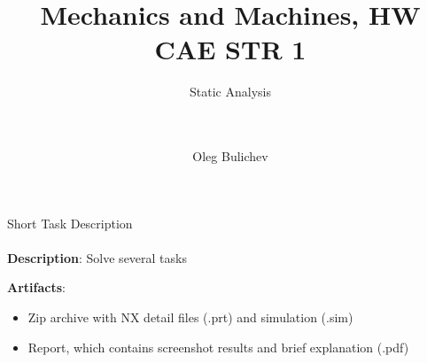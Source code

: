 \documentclass[aspectratio=169]{beamer}
\title[MaM]{Mechanics and Machines, HW CAE STR 1} %
\subtitle{Static Analysis
\\ \  \\ \ 
         } %
\author{Oleg Bulichev}
\newcommand{\fbckg}[1]{\usebackgroundtemplate{\texttt{[image: \#1]}}}%
\begin{document}
\setlength{\abovedisplayskip}{0pt}
\setlength{\belowdisplayskip}{0pt}
\setlength{\abovedisplayshortskip}{0pt}
\setlength{\belowdisplayshortskip}{0pt}

\fbckg{fibeamer/figs/title_page.png}

\fbckg{fibeamer/figs/common.png}

\note{\scriptsize \begin{itemize}
        \item \
    \end{itemize}}


\begin{frame}[t]{Short Task Description}
    \framesubtitle{}
    \textbf{Description}: Solve several tasks

    \textbf{Artifacts}:
    \begin{itemize}
        \item Zip archive with NX detail files (.prt) and simulation (.sim)
        \item Report, which contains screenshot results and brief explanation (.pdf)
    \end{itemize}
\end{frame}
\end{document}
